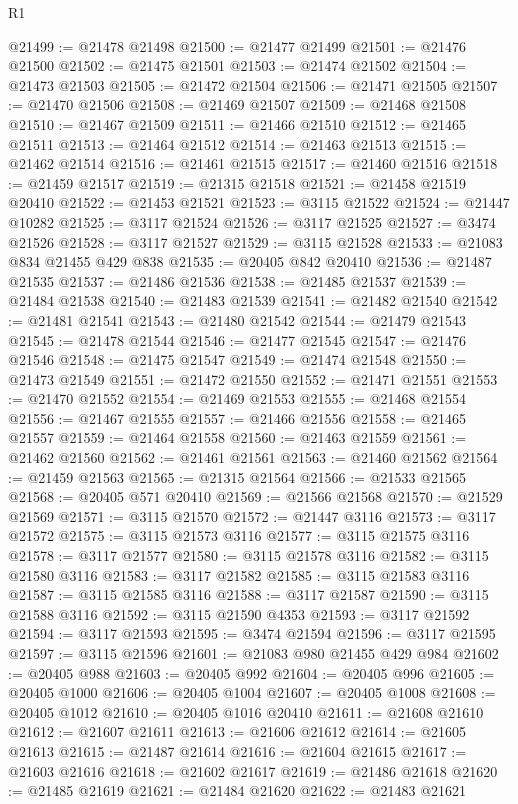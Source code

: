 \begin{lexlean}{R1}
\begin{coremodule}
@21499 := @21478 @21498
@21500 := @21477 @21499
@21501 := @21476 @21500
@21502 := @21475 @21501
@21503 := @21474 @21502
@21504 := @21473 @21503
@21505 := @21472 @21504
@21506 := @21471 @21505
@21507 := @21470 @21506
@21508 := @21469 @21507
@21509 := @21468 @21508
@21510 := @21467 @21509
@21511 := @21466 @21510
@21512 := @21465 @21511
@21513 := @21464 @21512
@21514 := @21463 @21513
@21515 := @21462 @21514
@21516 := @21461 @21515
@21517 := @21460 @21516
@21518 := @21459 @21517
@21519 := @21315 @21518
@21521 := @21458 @21519 @20410
@21522 := @21453 @21521
@21523 := @3115 @21522
@21524 := @21447 @10282
@21525 := @3117 @21524
@21526 := @3117 @21525
@21527 := @3474 @21526
@21528 := @3117 @21527
@21529 := @3115 @21528
@21533 := @21083 @834 @21455 @429 @838
@21535 := @20405 @842 @20410
@21536 := @21487 @21535
@21537 := @21486 @21536
@21538 := @21485 @21537
@21539 := @21484 @21538
@21540 := @21483 @21539
@21541 := @21482 @21540
@21542 := @21481 @21541
@21543 := @21480 @21542
@21544 := @21479 @21543
@21545 := @21478 @21544
@21546 := @21477 @21545
@21547 := @21476 @21546
@21548 := @21475 @21547
@21549 := @21474 @21548
@21550 := @21473 @21549
@21551 := @21472 @21550
@21552 := @21471 @21551
@21553 := @21470 @21552
@21554 := @21469 @21553
@21555 := @21468 @21554
@21556 := @21467 @21555
@21557 := @21466 @21556
@21558 := @21465 @21557
@21559 := @21464 @21558
@21560 := @21463 @21559
@21561 := @21462 @21560
@21562 := @21461 @21561
@21563 := @21460 @21562
@21564 := @21459 @21563
@21565 := @21315 @21564
@21566 := @21533 @21565
@21568 := @20405 @571 @20410
@21569 := @21566 @21568
@21570 := @21529 @21569
@21571 := @3115 @21570
@21572 := @21447 @3116
@21573 := @3117 @21572
@21575 := @3115 @21573 @3116
@21577 := @3115 @21575 @3116
@21578 := @3117 @21577
@21580 := @3115 @21578 @3116
@21582 := @3115 @21580 @3116
@21583 := @3117 @21582
@21585 := @3115 @21583 @3116
@21587 := @3115 @21585 @3116
@21588 := @3117 @21587
@21590 := @3115 @21588 @3116
@21592 := @3115 @21590 @4353
@21593 := @3117 @21592
@21594 := @3117 @21593
@21595 := @3474 @21594
@21596 := @3117 @21595
@21597 := @3115 @21596
@21601 := @21083 @980 @21455 @429 @984
@21602 := @20405 @988
@21603 := @20405 @992
@21604 := @20405 @996
@21605 := @20405 @1000
@21606 := @20405 @1004
@21607 := @20405 @1008
@21608 := @20405 @1012
@21610 := @20405 @1016 @20410
@21611 := @21608 @21610
@21612 := @21607 @21611
@21613 := @21606 @21612
@21614 := @21605 @21613
@21615 := @21487 @21614
@21616 := @21604 @21615
@21617 := @21603 @21616
@21618 := @21602 @21617
@21619 := @21486 @21618
@21620 := @21485 @21619
@21621 := @21484 @21620
@21622 := @21483 @21621

\end{coremodule}
\end{lexlean}
